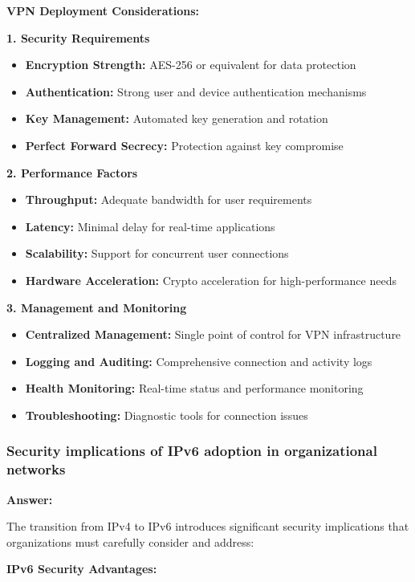 \documentclass[12pt,a4paper]{article}
\begin{document}
\textbf{VPN Deployment Considerations:}

\textbf{1. Security Requirements}
\begin{itemize}
    \item \textbf{Encryption Strength:} AES-256 or equivalent for data protection
    \item \textbf{Authentication:} Strong user and device authentication mechanisms
    \item \textbf{Key Management:} Automated key generation and rotation
    \item \textbf{Perfect Forward Secrecy:} Protection against key compromise
\end{itemize}

\textbf{2. Performance Factors}
\begin{itemize}
    \item \textbf{Throughput:} Adequate bandwidth for user requirements
    \item \textbf{Latency:} Minimal delay for real-time applications
    \item \textbf{Scalability:} Support for concurrent user connections
    \item \textbf{Hardware Acceleration:} Crypto acceleration for high-performance needs
\end{itemize}

\textbf{3. Management and Monitoring}
\begin{itemize}
    \item \textbf{Centralized Management:} Single point of control for VPN infrastructure
    \item \textbf{Logging and Auditing:} Comprehensive connection and activity logs
    \item \textbf{Health Monitoring:} Real-time status and performance monitoring
    \item \textbf{Troubleshooting:} Diagnostic tools for connection issues
\end{itemize}

\subsubsection{Security implications of IPv6 adoption in organizational networks}

\textbf{Answer:}

The transition from IPv4 to IPv6 introduces significant security implications that organizations must carefully consider and address:

\textbf{IPv6 Security Advantages:}
\end{document}
